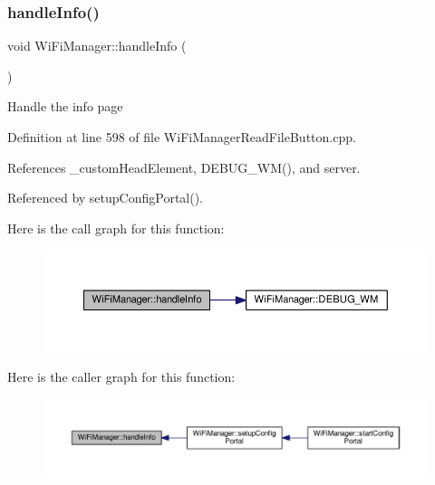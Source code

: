 \subsubsection{\texorpdfstring{handle\+Info()}{handleInfo()}}
{\footnotesize\ttfamily void Wi\+Fi\+Manager\+::handle\+Info (\begin{DoxyParamCaption}{ }\end{DoxyParamCaption})\hspace{0.3cm}{\ttfamily [private]}}

Handle the info page 

Definition at line 598 of file Wi\+Fi\+Manager\+Read\+File\+Button.\+cpp.



References \+\_\+custom\+Head\+Element, D\+E\+B\+U\+G\+\_\+\+W\+M(), and server.



Referenced by setup\+Config\+Portal().

Here is the call graph for this function\+:\nopagebreak
\begin{figure}[H]
\begin{center}
\leavevmode
\includegraphics[width=350pt]{d4/dc8/class_wi_fi_manager_ac35e46661f8a209d84bba62d9aa43a35_cgraph}
\end{center}
\end{figure}
Here is the caller graph for this function\+:\nopagebreak
\begin{figure}[H]
\begin{center}
\leavevmode
\includegraphics[width=350pt]{d4/dc8/class_wi_fi_manager_ac35e46661f8a209d84bba62d9aa43a35_icgraph}
\end{center}
\end{figure}
\mbox{\label{class_wi_fi_manager_a94fb1a8fcfbd0d02714c69138bf72f9c}} 

